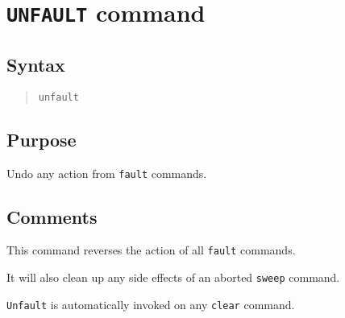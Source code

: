 %
%
%
%
\section{{\tt UNFAULT} command}
\subsection{Syntax}
\begin{verse}
{\tt unfault}
\end{verse}
\subsection{Purpose}

Undo any action from {\tt fault} commands.
\subsection{Comments}

This command reverses the action of all {\tt fault} commands.

It will also clean up any side effects of an aborted {\tt sweep} command.

{\tt Unfault} is automatically invoked on any {\tt clear} command.

